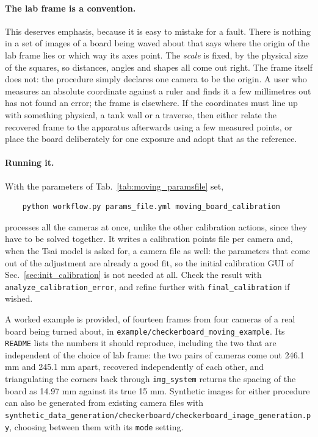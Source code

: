 \documentclass[10pt,a4paper]{article}
\begin{document}
\paragraph{The lab frame is a convention.} This deserves emphasis, because it is easy to mistake for a fault. There is nothing in a set of images of a board being waved about that says where the origin of the lab frame lies or which way its axes point. The \emph{scale} is fixed, by the physical size of the squares, so distances, angles and shapes all come out right. The frame itself does not: the procedure simply declares one camera to be the origin. A user who measures an absolute coordinate against a ruler and finds it a few millimetres out has not found an error; the frame is elsewhere. If the coordinates must line up with something physical, a tank wall or a traverse, then either relate the recovered frame to the apparatus afterwards using a few measured points, or place the board deliberately for one exposure and adopt that as the reference.

\paragraph{Running it.} With the parameters of Tab.~\ref{tab:moving_paramsfile} set,

\begin{verbatim}
    python workflow.py params_file.yml moving_board_calibration
\end{verbatim}

processes all the cameras at once, unlike the other calibration actions, since they have to be solved together. It writes a calibration points file per camera and, when the Tsai model is asked for, a camera file as well: the parameters that come out of the adjustment are already a good fit, so the initial calibration GUI of Sec.~\ref{sec:init_calibration} is not needed at all. Check the result with \texttt{analyze\_calibration\_error}, and refine further with \texttt{final\_calibration} if wished.

A worked example is provided, of fourteen frames from four cameras of a real board being turned about, in \texttt{example/checkerboard\_moving\_example}. Its \texttt{README} lists the numbers it should reproduce, including the two that are independent of the choice of lab frame: the two pairs of cameras come out 246.1 mm and 245.1 mm apart, recovered independently of each other, and triangulating the corners back through \texttt{img\_system} returns the spacing of the board as 14.97 mm against its true 15 mm. Synthetic images for either procedure can also be generated from existing camera files with \texttt{synthetic\_data\_generation/checkerboard/checkerboard\_image\_generation.py}, choosing between them with its \texttt{mode} setting.
\end{document}
